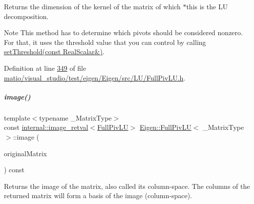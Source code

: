 \begin{DoxyReturn}{Returns}
the dimension of the kernel of the matrix of which $\ast$this is the LU decomposition.
\end{DoxyReturn}
\begin{DoxyNote}{Note}
This method has to determine which pivots should be considered nonzero. For that, it uses the threshold value that you can control by calling \hyperlink{group___l_u___module_a414592d82de98f5bd075965caf56d681}{set\+Threshold(const Real\+Scalar\&)}. 
\end{DoxyNote}


Definition at line \hyperlink{matio_2visual__studio_2test_2eigen_2_eigen_2src_2_l_u_2_full_piv_l_u_8h_source_l00349}{349} of file \hyperlink{matio_2visual__studio_2test_2eigen_2_eigen_2src_2_l_u_2_full_piv_l_u_8h_source}{matio/visual\+\_\+studio/test/eigen/\+Eigen/src/\+L\+U/\+Full\+Piv\+L\+U.\+h}.

\mbox{\label{group___l_u___module_a0893985d2dab367baa6e57c6fd0c4956}} 
\subparagraph{\texorpdfstring{image()}{image()}\hspace{0.1cm}{\footnotesize\ttfamily [1/2]}}
{\footnotesize\ttfamily template$<$typename \+\_\+\+Matrix\+Type$>$ \\
const \hyperlink{struct_eigen_1_1internal_1_1image__retval}{internal\+::image\+\_\+retval}$<$\hyperlink{group___l_u___module_class_eigen_1_1_full_piv_l_u}{Full\+Piv\+LU}$>$ \hyperlink{group___l_u___module_class_eigen_1_1_full_piv_l_u}{Eigen\+::\+Full\+Piv\+LU}$<$ \+\_\+\+Matrix\+Type $>$\+::image (\begin{DoxyParamCaption}\item[{const Matrix\+Type \&}]{original\+Matrix }\end{DoxyParamCaption}) const\hspace{0.3cm}{\ttfamily [inline]}}

\begin{DoxyReturn}{Returns}
the image of the matrix, also called its column-\/space. The columns of the returned matrix will form a basis of the image (column-\/space).
\end{DoxyReturn}

